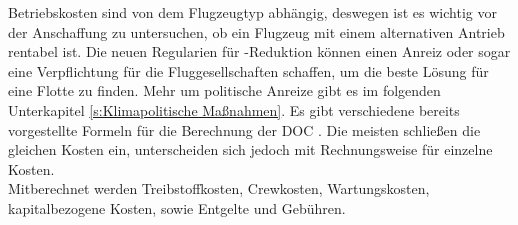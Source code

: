 Betriebskosten sind von dem Flugzeugtyp abhängig, deswegen ist es wichtig vor der Anschaffung zu untersuchen, 
ob ein Flugzeug mit einem alternativen Antrieb rentabel ist. Die neuen Regularien für -Reduktion können einen Anreiz oder sogar 
eine Verpflichtung für die Fluggesellschaften schaffen, um die beste Lösung für eine Flotte zu finden. 
Mehr um politische Anreize gibt es im folgenden Unterkapitel \ref{s:Klimapolitische Maßnahmen}.
%
Es gibt verschiedene bereits vorgestellte Formeln für die Berechnung der DOC \cite{scholz_design_evaluation_doc}. 
Die meisten schließen die gleichen Kosten ein, 
unterscheiden sich jedoch mit Rechnungsweise für einzelne Kosten.\\ 
Mitberechnet werden Treibstoffkosten, Crewkosten, Wartungskosten, kapitalbezogene Kosten, sowie Entgelte und Gebühren.


